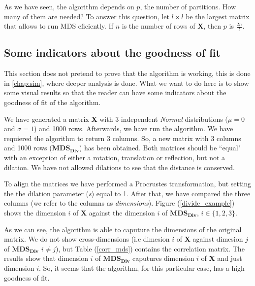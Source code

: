 \documentclass[11pt]{report}
\begin{document}
As we have seen, the algorithm depends on $p$, the number of partitions. How 
many of them are needed? To answer this question, let $l \times l$ be the largest 
matrix that allows to run MDS eficiently. If $n$ is the number of rows 
of \textbf{X}, then $p$ is $\frac{2n}{l}$. 

\subsection{Some indicators about the goodness of fit}
\label{chap:ind_div}
This section does not pretend to prove that the algorithm is working, this is 
done in \autoref{chap:sim}, where deeper analysis is done. What we want 
to do here is to show some visual results so that the reader can have some 
indicators about the goodness of fit of the algorithm. 

\indent We have generated a matrix \textbf{X} with 3 independent \textit{Normal} 
distributions ($\mu = 0$ and $\sigma = 1$) and 1000 rows. Afterwards, 
we have run the algorithm. We have requiered the algorithm to return 3 columns. 
So, a new matrix with 3 columns and 1000 rows ($\mathbf{MDS_{Div}}$) 
has been obtained. Both matrices should be ``equal" with an exception of either
a rotation, translation or reflection, but not a dilation. We have not
allowed dilations to see that the distance is conserved.

\indent To align the matrices we have performed a Procrustes transformation, but 
setting the the dilation parameter (\textit{s}) equal to 1. 
After that, we have compared the three columns (we refer to the columns as 
\textit{dimensions}). Figure (\ref{divide_example}) shows the dimension
$i$ of \textbf{X} against the dimension $i$ of $\mathbf{MDS_{Div}}$, 
$i \in \{1,2,3\}$. 

\indent As we can see, the algorithm is able to caputure the dimensions of the 
original matrix. We do not show cross-dimensions (i.e dimesion $i$ of \textbf{X}
against dimesion $j$ of $\mathbf{MDS_{Div}}$ $ i \neq j$), but Table 
(\ref{corr_mds}) contains the correlation matrix. The results 
show that dimension  $i$ of  $\mathbf{MDS_{Div}}$ caputures dimension 
$i$ of \textbf{X} and just dimension $i$. So, it seems that the algorithm, for 
this particular case, has a high goodness of fit.
\end{document}
